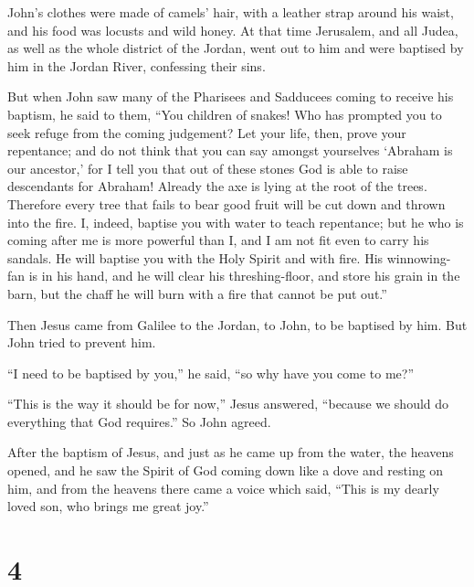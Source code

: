  John's clothes were made of camels' hair, with a leather
strap around his waist, and his food was locusts and wild honey.
 At that time Jerusalem, and all Judea, as well as the whole
district of the Jordan, went out to him  and were baptised
by him in the Jordan River, confessing their sins.

 But when John saw many of the Pharisees and Sadducees
coming to receive his baptism, he said to them, ``You children of
snakes! Who has prompted you to seek refuge from the coming judgement?
 Let your life, then, prove your repentance; 
and do not think that you can say amongst yourselves `Abraham is our
ancestor,' for I tell you that out of these stones God is able to raise
descendants for Abraham!  Already the axe is lying at the
root of the trees. Therefore every tree that fails to bear good fruit
will be cut down and thrown into the fire.  I, indeed,
baptise you with water to teach repentance; but he who is coming after
me is more powerful than I, and I am not fit even to carry his sandals.
He will baptise you with the Holy Spirit and with fire. 
His winnowing-fan is in his hand, and he will clear his threshing-floor,
and store his grain in the barn, but the chaff he will burn with a fire
that cannot be put out.''

 Then Jesus came from Galilee to the Jordan, to John, to be
baptised by him.  But John tried to prevent him.

``I need to be baptised by you,'' he said, ``so why have you come to
me?''

 ``This is the way it should be for now,'' Jesus answered,
``because we should do everything that God requires.'' So John agreed.

 After the baptism of Jesus, and just as he came up from
the water, the heavens opened, and he saw the Spirit of God coming down
like a dove and resting on him,  and from the heavens there
came a voice which said, ``This is my dearly loved son, who brings me
great joy.''

\hypertarget{section-3}{%
\section{4}\label{section-3}}

